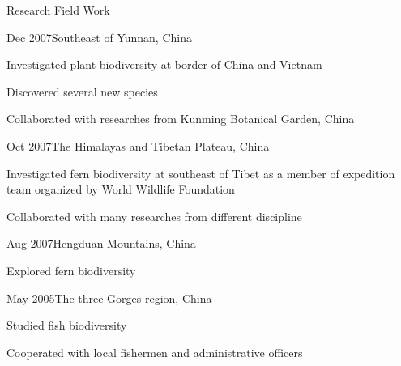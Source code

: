 \documentclass{resume} %
\begin{document}
\begin{rSection}{Research Field Work}{}{}
\begin{rSubsection}{Dec 2007}{Southeast of Yunnan, China}{}{}
\item Investigated plant biodiversity at border of China and Vietnam
\item Discovered several new species
\item Collaborated with researches from Kunming Botanical Garden, China
\end{rSubsection}

\begin{rSubsection}{Oct 2007}{The Himalayas and Tibetan Plateau, China}{}{}
\item Investigated fern biodiversity at southeast of Tibet as a member of expedition team organized by World Wildlife Foundation
\item Collaborated with many researches from different discipline 
\end{rSubsection}

\begin{rSubsection}{Aug 2007}{Hengduan Mountains, China}{}{}
\item Explored fern biodiversity 
\end{rSubsection}

\begin{rSubsection}{May 2005}{The three Gorges region, China}{}{}
\item Studied fish biodiversity 
\item Cooperated with local fishermen and administrative officers
\end{rSubsection}

\end{rSection}
\end{document}
